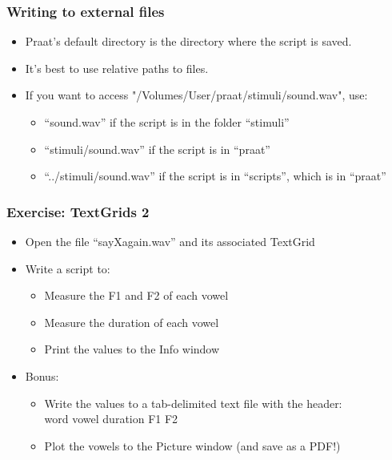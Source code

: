 \documentclass[handout]{beamer}
\begin{document}
\begin{frame}[fragile]
\frametitle{Writing to external files}
\begin{itemize}
    \item <1-> Praat's default directory is the directory where the script is saved.

    \item <1-> It's best to use relative paths to files.

    \item <1-> If you want to access "/Volumes/User/praat/stimuli/sound.wav", use:
    \begin{itemize}
        \item ``sound.wav'' if the script is in the folder ``stimuli''
        \item ``stimuli/sound.wav'' if the script is in ``praat''
        \item ``../stimuli/sound.wav'' if the script is in ``scripts'', which is in ``praat''
    \end{itemize}
\end{itemize}
\end{frame}

\begin{frame}[fragile]
\frametitle{Exercise: TextGrids 2}
    \begin{itemize}
        \item Open the file ``sayXagain.wav'' and its associated TextGrid
        \item Write a script to:
        \begin{itemize}
            \item Measure the F1 and F2 of each vowel
            \item Measure the duration of each vowel
            \item Print the values to the Info window
        \end{itemize}
        \item Bonus:
        \begin{itemize}
            \item Write the values to a tab-delimited text file with the header:\\
            word    vowel    duration    F1    F2
            \item Plot the vowels to the Picture window (and save as a PDF!)
        \end{itemize}
    \end{itemize}
\end{frame}
\end{document}
